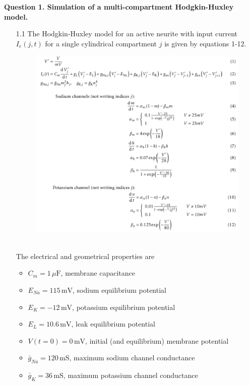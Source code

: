 \documentclass[12pt]{article}
\begin{document}
\noindent


\noindent\textbf{Question 1. Simulation of a multi-compartment Hodgkin-Huxley model.}
\begin{enumerate}
    \item[1.1] The Hodgkin-Huxley model for an active neurite with input current $I_{e}(j, t)$ 
    for a single cylindrical compartment $j$ is given by equations 1-12.
    \begin{figure}[h!]
        \centering
        \includegraphics[width=1\textwidth]{Eqs.png}
    \end{figure}\\
    The electrical and geometrical properties are
    \begin{itemize}
        \item $C_{m} = 1 \, \mu \text{F}$, membrane capacitance
        \item $E_{Na}=115 \, \text{mV}$, sodium equilibrium potential
        \item $E_{K}=-12 \, \text{mV}$, potassium equilibrium potential
        \item $E_{L}=10.6 \, \text{mV}$, leak equilibrium potential
        \item $V(t=0)=0 \, \text{mV}$, initial (and equilibrium) membrane potential
        \item $\bar{g}_{Na}=120 \, \text{mS}$, maximum sodium channel conductance
        \item $\bar{g}_{K}=36 \, \text{mS}$, maximum potassium channel conductance

\end{itemize}
\end{enumerate}
\end{document}
